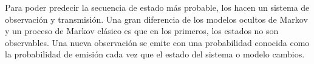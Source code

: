 \uncm

Para poder predecir la secuencia de estado más probable, los \HMM hacen un sistema de observación y transmisión. Una gran diferencia de los modelos ocultos de Markov y un proceso de Markov clásico es que en los primeros, los estados no son observables.  Una nueva observación se emite con una probabilidad conocida como la probabilidad de emisión cada vez que el estado del sistema o modelo cambios. 








 













%

